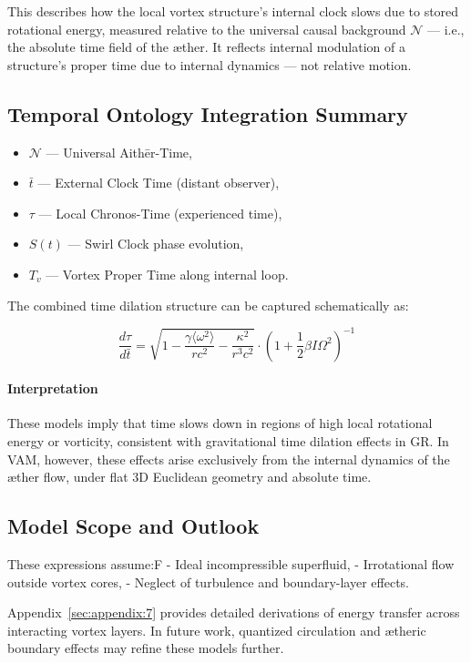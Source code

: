 This describes how the local vortex structure's internal clock slows due to stored rotational energy, measured relative to the universal causal background $\mathcal{N}$ — i.e., the absolute time field of the æther. It reflects internal modulation of a structure's proper time due to internal dynamics — not relative motion.


\subsection*{Temporal Ontology Integration Summary}

\begin{itemize}
    \item \( \mathcal{N} \) — Universal Aithēr-Time,
    \item \( \bar{t} \) — External Clock Time (distant observer),
    \item \( \tau \) — Local Chronos-Time (experienced time),
    \item \( S(t) \) — Swirl Clock phase evolution,
    \item \( T_v \) — Vortex Proper Time along internal loop.
\end{itemize}

The combined time dilation structure can be captured schematically as:

\begin{equation}
\boxed{
\frac{d\tau}{d\bar{t}} =
\sqrt{1 - \frac{\gamma \langle \omega^2 \rangle}{r c^2} - \frac{\kappa^2}{r^3 c^2}} \cdot
\left(1 + \frac{1}{2} \beta I \Omega^2 \right)^{-1}
}
\label{eq:VAM_combined_time_dilation}
\end{equation}


\paragraph{Interpretation}

These models imply that time slows down in regions of high local rotational energy or vorticity, consistent with gravitational time dilation effects in GR. In VAM, however, these effects arise exclusively from the internal dynamics of the æther flow, under flat 3D Euclidean geometry and absolute time.

\subsection*{Model Scope and Outlook}

These expressions assume:F
- Ideal incompressible superfluid,
- Irrotational flow outside vortex cores,
- Neglect of turbulence and boundary-layer effects.

Appendix~\ref{sec:appendix:7} provides detailed derivations of energy transfer across interacting vortex layers. In future work, quantized circulation and ætheric boundary effects may refine these models further.
